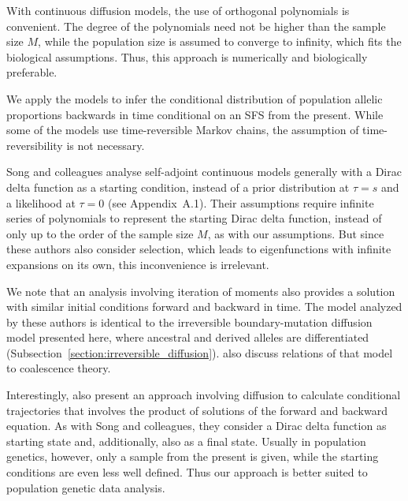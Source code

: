 \documentclass[preprint]{elsarticle}
\begin{document}
With continuous diffusion models, the use of orthogonal polynomials is convenient. The degree of the polynomials need not be higher than the sample size $M$, while the population size is assumed to converge to infinity, which fits the biological assumptions. Thus, this approach is numerically and biologically preferable. 

We apply the models to infer the conditional distribution of population allelic proportions backwards in time conditional on an SFS from the present. While some of the models use time-reversible Markov chains, the assumption of time-reversibility is not necessary.%

Song and colleagues \citep{Song12,Stei13,Stei14,Zivk15} analyse self-adjoint continuous models generally with a Dirac delta function as a starting condition, instead of a prior distribution at $\tau=s$ and a likelihood at $\tau=0$ (see Appendix~A.1). Their assumptions require infinite series of polynomials to represent the starting Dirac delta function, instead of only up to the order of the sample size $M$, as with our assumptions. But since these authors also consider selection, which leads to eigenfunctions with infinite expansions on its own, this inconvenience is irrelevant. 

We note that an analysis involving iteration of moments \citep{Evan07,Zivk11} also provides a solution with similar initial conditions forward and backward in time. The model analyzed by these authors is identical to the irreversible boundary-mutation diffusion model presented here, where ancestral and derived alleles are differentiated (Subsection~\ref{section:irreversible_diffusion}). \citet{Zivk11} also discuss relations of that model to coalescence theory. 

Interestingly, \citet{Zhao13} also present an approach involving diffusion to calculate conditional trajectories that involves the product of solutions of the forward and backward equation. As with Song and colleagues, they consider a Dirac delta function as starting state and, additionally, also as a final state. Usually in population genetics, however, only a sample from the present is given, while the starting conditions are even less well defined. Thus our approach is better suited to population genetic data analysis. 
\end{document}
